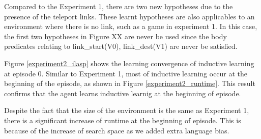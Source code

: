 
Compared to the Experiment 1, there are two new hypotheses due to the presence of the teleport links.
These learnt hypotheses are also applicables to an environment where there is no link, such as a game in experiment 1.
In this case, the first two hypotheses in Figure XX are never be used since the body predicates relating to link\_start(V0), link\_dest(V1) are never be satisfied.

Figure \ref{experiment2_ilasp} shows the learning convergence of inductive learning at episode 0.
Similar to Experiment 1, most of inductive learning occur at the beginning of the episode, as shown in Figure \ref{experiment2_runtime}. 
This result confirms that the agent learns inductive learnig at the beginning of episode.

Despite the fact that the size of the environment is the same as Experiment 1, 
there is a significant increase of runtime at the beginning of episode. This is because of the increase of search space as we added extra language bias.

